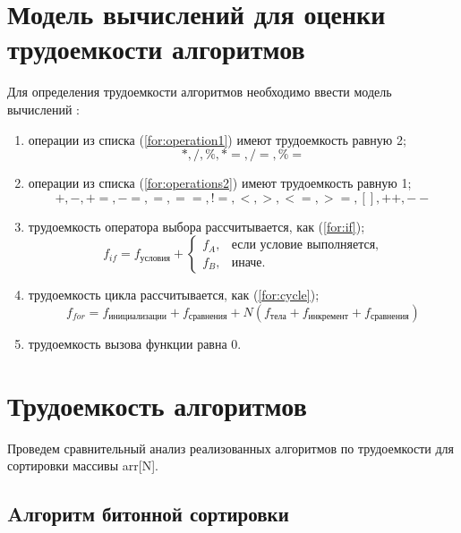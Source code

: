 \section{Модель вычислений для оценки трудоемкости алгоритмов}

Для определения трудоемкости алгоритмов необходимо ввести модель вычислений \cite{alg1}:

\begin{enumerate}
	\item операции из списка (\ref{for:operation1}) имеют трудоемкость равную 2;
	\begin{equation}
		\label{for:operation1}
		*, /, \%, *=, /=, \%=
	\end{equation}
	\item операции из списка (\ref{for:operations2}) имеют трудоемкость равную 1;
	\begin{equation}
		\label{for:operations2}
		+, -, +=, -=, =, ==, !=, <, >, <=, >=, [], ++, {-}-
	\end{equation}
	\item трудоемкость оператора выбора  рассчитывается, как (\ref{for:if});
	\begin{equation}
		\label{for:if}
		f_{if} = f_{\text{условия}} +
		\begin{cases}
			f_A, & \text{если условие выполняется,}\\
			f_B, & \text{иначе.}
		\end{cases}
	\end{equation}
	\item трудоемкость цикла рассчитывается, как (\ref{for:cycle});
	\begin{equation}
		\label{for:cycle}
		f_{for} = f_{\text{инициализации}} + f_{\text{сравнения}} + N(f_{\text{тела}} + f_{\text{инкремент}} + f_{\text{сравнения}})
	\end{equation}
	\item трудоемкость вызова функции равна 0.
\end{enumerate}
\clearpage
\section{Трудоемкость алгоритмов}

Проведем сравнительный анализ реализованных алгоритмов по трудоемкости для сортировки массивы
arr[N].

\subsection{Aлгоритм битонной сортировки}

